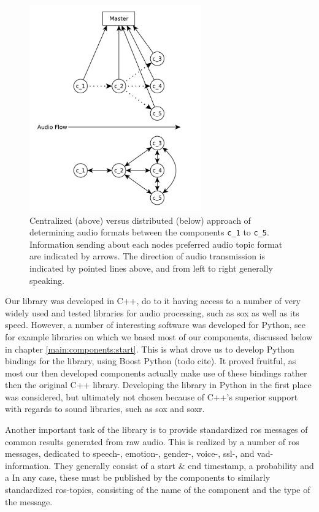 \begin{figure}[]
	\centering
	\includegraphics[width=0.66\textwidth]{diagrams/lib_central_vs_dist.pdf}
	\caption{Centralized (above) versus distributed (below) approach of determining audio formats between the components \texttt{c\_1} to \texttt{c\_5}.
		Information sending about each nodes preferred audio topic format are indicated by arrows.
		The direction of audio transmission is indicated by pointed lines above, and from left to right generally speaking.}
	\label{pic:main:lib:central_vs_dist}
\end{figure}

Our library was developed in C++, do to it having access to a number of very widely used and tested libraries for audio processing, such as \gls{sox} as well as its speed.
However, a number of interesting software was developed for Python, see for example libraries on which we based most of our components, discussed below in chapter \ref{main:components:start}.
This is what drove us to develop Python bindings for the library, using Boost Python (todo cite).
It proved fruitful, as most our then developed components actually make use of these bindings rather then the original C++ library.
Developing the library in Python in the first place was considered, but ultimately not chosen because of C++'s superior support with regards to sound libraries, such as \gls{sox} and \gls{soxr}.

Another important task of the library is to provide standardized \gls{ros} messages of common results generated from raw audio.
This is realized by a number of \gls{ros} messages, dedicated to speech-, emotion-, gender-, voice-, \gls{ssl}-, and \gls{vad}- information.
They generally consist of a start \& end timestamp, a probability and a 
In any case, these must be published by the components to similarly standardized \gls{ros}-topics, consisting of the name of the component and the type of the message.

